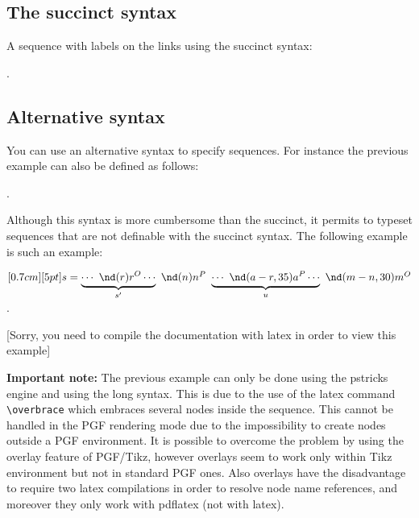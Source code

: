 \subsection{The succinct syntax}
A sequence with labels on the links using the succinct syntax:
\begin{codeexample}[width=7cm]
.
\end{codeexample}

\subsection{Alternative syntax}
You can use an alternative syntax to specify sequences. For instance the previous example
can also be defined as follows:
\begin{codeexample}[width=7cm]
.
\end{codeexample}
Although this syntax is more cumbersome than the succinct, it permits to typeset sequences that are
not definable with the succinct syntax. The following example is such an example:
\ifLoadPSengine
\begin{codeexample}[width=6cm]
$\pstr[0.7cm][5pt]{ s = \underbrace{\cdots\ \nd(r){r}^O
\cdots }_{s'}\ \nd(n){n}^P
\ \underbrace{\cdots\ \nd(a-r,35){a}^P \cdots }_{u}
\ \nd(m-n,30){m}^O }$.
\end{codeexample}
\else
\vskip 10pt
[Sorry, you need to compile the documentation with latex in order to view this example]
\vskip 10pt
\fi

{\bf Important note:}
The previous example can only be done using the pstricks engine and using the long syntax. This is due to the use of the
latex command \verb|\overbrace| which embraces several nodes inside the sequence.
This cannot be handled in the PGF rendering mode due to the impossibility to create nodes outside a PGF environment.
It is possible to overcome the problem by using the overlay feature of PGF/Tikz, however overlays seem to work only
within Tikz environment but not in standard PGF ones. Also overlays have the disadvantage
to require two latex compilations in order to resolve node name references, and moreover they only work with pdflatex (not with latex).


